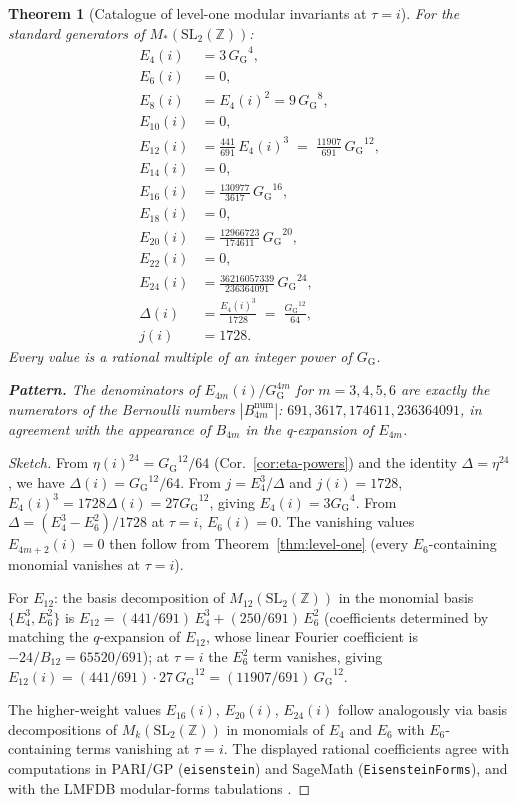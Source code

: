 \documentclass[11pt]{article}
\newtheorem{theorem}{Theorem}[section]
\theoremstyle{definition}
\theoremstyle{remark}
\newcommand{\GG}{G_{\!\scriptscriptstyle\mathrm{G}}}
\newcommand{\Z}{\mathbb{Z}}
\begin{document}
\begin{theorem}[Catalogue of level-one modular invariants at $\tau = i$]\label{thm:catalogue}
For the standard generators of $M_*(\mathrm{SL}_2(\Z))$:
\begin{align}
E_4(i) &= 3\,{\GG}^4, \\
E_6(i) &= 0, \\
E_8(i) &= E_4(i)^2 = 9\,{\GG}^8, \\
E_{10}(i) &= 0, \\
E_{12}(i) &= \frac{441}{691}\,E_4(i)^3 \;=\; \frac{11907}{691}\,{\GG}^{12}, \\
E_{14}(i) &= 0, \\
E_{16}(i) &= \frac{130977}{3617}\,{\GG}^{16}, \\
E_{18}(i) &= 0, \\
E_{20}(i) &= \frac{12966723}{174611}\,{\GG}^{20}, \\
E_{22}(i) &= 0, \\
E_{24}(i) &= \frac{36216057339}{236364091}\,{\GG}^{24}, \\
\Delta(i) &= \frac{E_4(i)^3}{1728} \;=\; \frac{{\GG}^{12}}{64}, \\
j(i) &= 1728.
\end{align}
Every value is a rational multiple of an integer power of $\GG$.

\textbf{Pattern.} The denominators of $E_{4m}(i)/\GG^{4m}$ for $m = 3, 4, 5, 6$
are exactly the numerators of the Bernoulli numbers $|B_{4m}^{\mathrm{num}}|$:
$691, 3617, 174611, 236364091$, in agreement with the
appearance of $B_{4m}$ in the q-expansion of $E_{4m}$.
\end{theorem}

\begin{proof}[Sketch]
From $\eta(i)^{24} = {\GG}^{12}/64$ (Cor.~\ref{cor:eta-powers}) and the
identity $\Delta = \eta^{24}$, we have $\Delta(i) = {\GG}^{12}/64$. From
$j = E_4^3/\Delta$ and $j(i) = 1728$, $E_4(i)^3 = 1728\Delta(i) = 27{\GG}^{12}$,
giving $E_4(i) = 3{\GG}^4$. From $\Delta = (E_4^3 - E_6^2)/1728$ at
$\tau = i$, $E_6(i) = 0$. The vanishing values $E_{4m+2}(i) = 0$ then
follow from Theorem~\ref{thm:level-one} (every $E_6$-containing
monomial vanishes at $\tau = i$).

For $E_{12}$: the basis decomposition of $M_{12}(\mathrm{SL}_2(\Z))$ in
the monomial basis $\{E_4^{3}, E_6^{2}\}$ is
$E_{12} = (441/691)\,E_4^{3} + (250/691)\,E_6^{2}$
(coefficients determined by matching the $q$-expansion of $E_{12}$,
whose linear Fourier coefficient is $-24/B_{12} = 65520/691$); at
$\tau = i$ the $E_6^{2}$ term vanishes, giving
$E_{12}(i) = (441/691) \cdot 27\,{\GG}^{12} = (11907/691)\,{\GG}^{12}$.

The higher-weight values $E_{16}(i)$, $E_{20}(i)$, $E_{24}(i)$ follow
analogously via basis decompositions of $M_{k}(\mathrm{SL}_2(\Z))$ in
monomials of $E_4$ and $E_6$ with $E_6$-containing terms vanishing at
$\tau = i$. The displayed rational coefficients agree with computations
in PARI/GP (\texttt{eisenstein}) and SageMath
(\texttt{EisensteinForms}), and with the LMFDB modular-forms
tabulations \cite{lmfdb}.
\end{proof}
\end{document}
